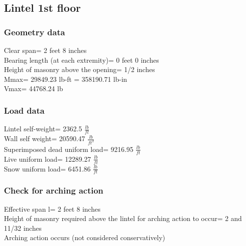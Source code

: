 \subsection{Lintel 1st floor}

\subsubsection{Geometry data}
Clear span=  2 feet 8 inches \\
Bearing length (at each extremity)=  0 feet 0 inches \\
Height of masonry above the opening=  1/2 inches \\
Mmax=  29849.23 lb-ft = 358190.71  lb-in \\
Vmax=  44768.24 lb

\subsubsection{Load data}
Lintel self-weight=  2362.5  $\frac{lb}{ft}$ \\
Wall self weight=  20590.47 $\frac{lb}{ft^2}$\\
Superimposed dead uniform load=  9216.95 $\frac{lb}{ft}$ \\
Live uniform load=  12289.27 $\frac{lb}{ft}$ \\
Snow uniform load=  6451.86 $\frac{lb}{ft}$ 

\subsubsection{Check for arching action}
Effective span l=  2 feet 8 inches \\
Height of masonry required above the lintel for arching action to occur=  2 and 11/32 inches \\
Arching action occurs (not considered conservatively) 

